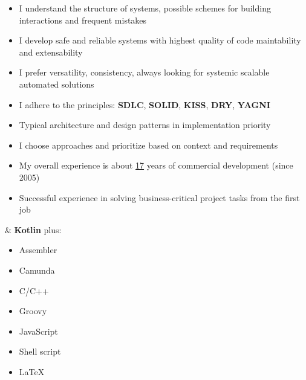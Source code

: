     \begin{minipage}[t]{0.76\textwidth} %
        \vspace{-\baselineskip} %


        \begin{itemize}[leftmargin=.0in]
        	\setlength\itemsep{0em}
            \item I understand the structure of systems, possible schemes for building interactions and frequent mistakes
            \item I develop safe and reliable systems with highest quality of code maintability and extensability
            \item I prefer versatility, consistency, always looking for systemic scalable automated solutions
            \item I adhere to the principles: \textbf{SDLC}, \textbf{SOLID}, \textbf{KISS}, \textbf{DRY}, \textbf{YAGNI}
            \item Typical architecture and design patterns in implementation priority
            \item I choose approaches and prioritize based on context and requirements
            \item My overall experience is about \underline{17} years of commercial development (since 2005)
            \item Successful experience in solving business-critical project tasks from the first job
        \end{itemize}

    \end{minipage}
    \hfill %
    \begin{minipage}[t]{0.20\textwidth} %
        \vspace{-\baselineskip}


         \& \textbf{Kotlin} plus:
        \begin{itemize}[leftmargin=.2in]
        	\setlength\itemsep{0em}
        	\item Assembler
        	\item Camunda
        	\item C/C++
           	\item Groovy
           	\item JavaScript
           	\item Shell script


            \item \LaTeX
        \end{itemize}
    \end{minipage}

\vspace{0.4cm}